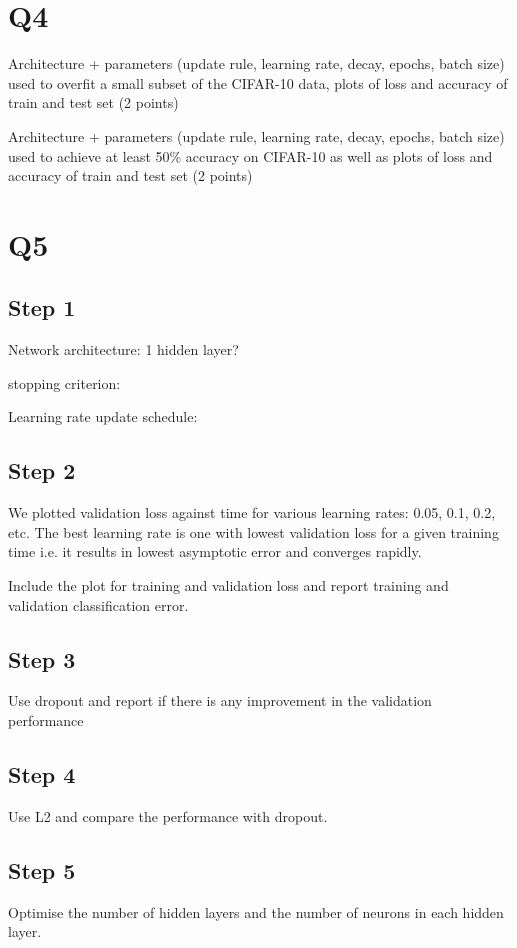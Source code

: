 \documentclass[12pt, a4paper]{article}
\begin{document}
\section*{Q4}
Architecture + parameters (update rule, learning rate, decay, epochs, batch size) used to overfit a small subset of the CIFAR-10 data, plots of loss and accuracy of train and test set (2 points)\par
\bigskip
Architecture + parameters (update rule, learning rate, decay, epochs, batch size) used to achieve at least 50\% accuracy on CIFAR-10 as well as plots of loss and accuracy of train and test set (2 points)

\section*{Q5}

\subsection*{Step 1}
Network architecture: 1 hidden layer?\par
stopping criterion:\par
Learning rate update schedule:\par

\subsection*{Step 2}
We plotted validation loss against time for various learning rates: 0.05, 0.1, 0.2, etc. The best learning rate is one with lowest validation loss for a given training time i.e. it results in lowest asymptotic error and converges rapidly.\par
\bigskip
Include the plot for training and validation loss and report training and validation classification error.

\subsection*{Step 3}
Use dropout and report if there is any improvement in the validation performance

\subsection*{Step 4}
Use L2 and compare the performance with dropout.

\subsection*{Step 5}
Optimise the number of hidden layers and the number of neurons in each hidden layer.
\end{document}
